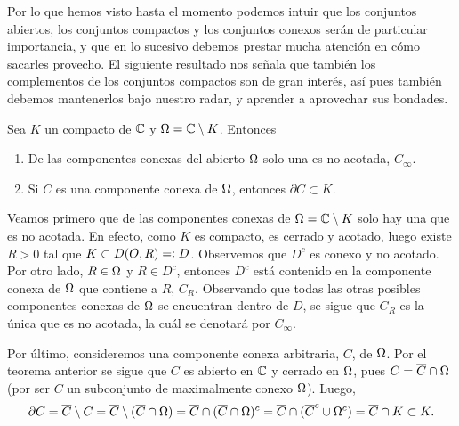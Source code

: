 Por lo que hemos visto hasta el momento podemos intuir que los conjuntos abiertos, los conjuntos compactos y los 
conjuntos conexos serán de particular importancia, y que en lo sucesivo debemos prestar mucha atención en cómo 
sacarles provecho. El siguiente resultado nos señala que también los complementos de los conjuntos compactos son 
de gran interés, así pues también debemos mantenerlos bajo nuestro radar, y aprender a aprovechar sus bondades.

\begin{theo}
    Sea $K$ un compacto de $\mathbb{C}$ y $\Omega = \mathbb{C} \setminus K$. Entonces
    \begin{enumerate}
        \item De las componentes conexas del abierto $\Omega$ solo una es no acotada, $C_{\infty}$.
        \item Si $C$ es una componente conexa de $\Omega$, entonces $\partial C \subset K$.
    \end{enumerate}
\end{theo}
\begin{dem}
    Veamos primero que de las componentes conexas de $\Omega = \mathbb{C} \setminus K$ solo hay una que es no acotada. En efecto,
    como $K$ es compacto, es cerrado y acotado, luego existe $R > 0$ tal que $K \subset D(O, R) = \vcentcolon D$.
    Observemos que $D^c$ es conexo y no acotado. Por otro lado, $R \in \Omega$ y $R\in D^c$, entonces $D^c$ está contenido
    en la componente conexa de $\Omega$ que contiene a $R$, $C_R$. Observando que todas las otras posibles componentes conexas de
    $\Omega$ se encuentran dentro de $D$, se sigue que $C_R$ es la única que es no acotada, la cuál se denotará por $C_{\infty}$.

    Por último, consideremos una componente conexa arbitraria, $C$, de $\Omega$. Por el teorema anterior se sigue que $C$ es abierto
    en $\mathbb{C}$ y cerrado en $\Omega$, pues $C=\overline{C}\cap \Omega$ (por ser $C$ un subconjunto de maximalmente conexo $\Omega$). Luego, 
    $$
    \partial C = \overline{C}\setminus C = \overline{C}\setminus (\overline{C}\cap \Omega) =
    \overline{C}\cap (\overline{C}\cap \Omega)^c= \overline{C}\cap(\overline{C}^c \cup \Omega^c) =
    \overline{C} \cap K \subset K.
    $$
\end{dem}
